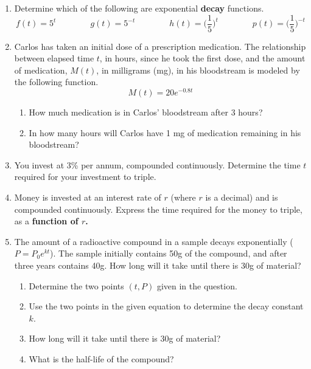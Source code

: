 \begin{enumerate}


\item Determine which of the following are exponential \textbf{decay} functions.
$$f(t)=5^t \quad \quad \quad \quad g(t)=5^{-t}  \quad \quad \quad \quad h(t)=\Big(\frac{1}{5}\Big)^{t}  \quad \quad \quad \quad p(t)=\Big(\frac{1}{5}\Big)^{-t}$$



\item Carlos has taken an initial dose of a prescription medication.  The relationship between elapsed time $t$, in hours, since he took the first dose, and the amount of medication, $M(t)$, in milligrams (mg), in his bloodstream is modeled by the following function. $$M(t)=20e^{-0.8t}$$

\begin{enumerate}
\item  How much medication is in Carlos' bloodstream after 3 hours?\vfill
\item In how many hours will Carlos have 1 mg of medication remaining in his bloodstream?\vfill
\vfill
\end{enumerate}

\clearpage

\item You invest at 3\% per annum, compounded continuously.  Determine
  the time $t$ required for your investment to triple.

  \vfill


\item Money is invested at an interest rate of $r$ (where $r$ is a
  decimal) and is compounded continuously.  Express the time required
  for the money to triple, as a \textbf{function of $r$.}

  \vfill

\clearpage
  
\item The amount of a radioactive compound in a sample decays exponentially ($P=P_0e^{kt}$).  The sample initially contains 50g of the compound, and after three years contains 40g.  How long will it take until there is 30g of material?
\begin{enumerate}
\item Determine the two points $(t,P)$ given in the question.\\[.5in]
\item Use the two points in the given equation to determine the decay constant $k$.
\vfill
\item How long will it take until there is 30g of material?
\vfill
\item What is the half-life of the compound?\vfill
\end{enumerate}


\end{enumerate}
